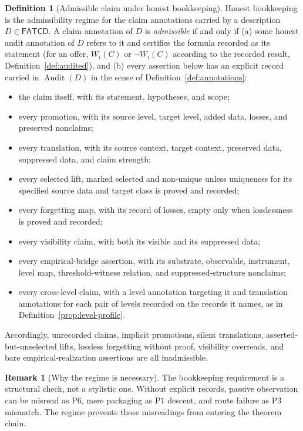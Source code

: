 \documentclass[11pt]{article}
\theoremstyle{definition}
\newtheorem{definition}[theorem]{Definition}
\newtheorem{remark}[theorem]{Remark}
\newcommand{\FATCD}{\ensuremath{\mathsf{FATCD}}}
\newcommand{\Audit}[1]{\ensuremath{\operatorname{Audit}\!\left(#1\right)}}
\newcommand{\Pone}{\ensuremath{\mathrm{P1}}}
\newcommand{\Pthree}{\ensuremath{\mathrm{P3}}}
\newcommand{\Psix}{\ensuremath{\mathrm{P6}}}
\begin{document}
\begin{definition}[Admissible claim under honest bookkeeping]\label{prop:honest-bookkeeping}
Honest bookkeeping is the admissibility regime for the claim annotations
carried by a description \(D \in \FATCD{}\). A claim annotation of \(D\) is
\emph{admissible} if and only if (a) some honest audit annotation of
\(D\) refers to it and certifies the formula recorded as its statement (for an offer, \(W_i(C)\) or
\(\neg W_i(C)\) according to the recorded result, Definition~\ref{def:audited}),
and (b) every assertion below has an explicit record carried in \(\Audit{D}\)
in the sense of Definition~\ref{def:annotations}:
\begin{itemize}[topsep=2pt,itemsep=1pt]
  \item the claim itself, with its statement, hypotheses, and scope;
  \item every promotion, with its source level, target level, added data,
    losses, and preserved nonclaims;
  \item every translation, with its source context, target context,
    preserved data, suppressed data, and claim strength;
  \item every selected lift, marked selected and non-unique unless uniqueness for its specified source data and target class is proved and recorded;
  \item every forgetting map, with its record of losses, empty only when
    losslessness is proved and recorded;
  \item every visibility claim, with both its visible and its suppressed
    data;
  \item every empirical-bridge assertion, with its substrate, observable,
    instrument, level map, threshold-witness relation, and
    suppressed-structure nonclaims;
  \item every cross-level claim, with a level annotation targeting it and
    translation annotations for each pair of levels recorded on the records it
    names, as in Definition~\ref{prop:level-profile}.
\end{itemize}
Accordingly, unrecorded claims, implicit promotions, silent translations,
asserted-but-unselected lifts, lossless forgetting without proof,
visibility overreads, and bare empirical-realization assertions are all
inadmissible.
\end{definition}

\begin{remark}[Why the regime is necessary]\label{rem:why-honest-bookkeeping}
The bookkeeping requirement is a structural check, not a stylistic
one. Without explicit records, passive observation can be misread as
\Psix{}, mere packaging as \Pone{} descent, and route failure as
\Pthree{} mismatch. The regime prevents those misreadings from
entering the theorem chain.
\end{remark}
\end{document}
